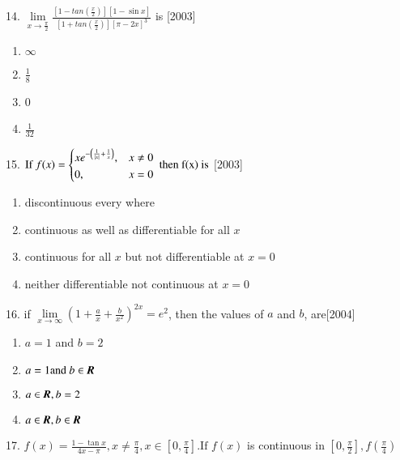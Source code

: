 \documentclass[journal,12pt,twocolumn]{IEEEtran}
\theoremstyle{remark}
\begin{document}
14. $\displaystyle \lim\limits_{x\to\frac{\pi}{2}}\frac{\left[1-tan\left(\frac{x}{2}\right)\right]\left[1-\sin x\right]}{ \left[1+tan\left(\frac{x}{2}\right)\right]\left[\pi-2x\right]^3}$ is \hfill [2003]

\begin{enumerate}
    \item $\infty$
    \item $\frac{1}{8}$
    \item 0
    \item $\frac{1}{32}$\\[2pt]
\end{enumerate}

15. $\displaystyle \text{If } f(x)=
    \begin{dcases}
        xe^{-\left( \frac{1}{|x|} + \frac{1}{x} \right)},&x\neq 0\\ 
        0                                    ,&x = 0
    \end{dcases}
   \text{ then f(x) is}
$ \hfill [2003]

\begin{enumerate}
    \item discontinuous every where
    \item continuous as well as differentiable for all $x$
    \item continuous for all $x$ but not differentiable at $x=0$
    \item neither differentiable not continuous at $x=0$
\end{enumerate}

16. if $\displaystyle \lim\limits_{x\to\infty}\left(1+\frac{a}{x}+\frac{b}{x^2}\right)^{2x}=e^2$, then the values of $a$ and $b$, are\hfill [2004]

\begin{enumerate}
    \item $a=1$ and $b=2$
    \item $a=1 \text{and }b\in \textbf{\textit{R}}$
    \item $a\in \textbf{\textit{R}},b=2$
    \item $a\in \textbf{\textit{R}},b\in \textbf{\textit{R}}$\\[2pt]
\end{enumerate}

17. $\displaystyle f(x)=\frac{1-\tan x}{4x-\pi}, x\neq\frac{\pi}{4},x\in\left[0,\frac{\pi}{4}\right]\text{.If }f(x)$ is continuous in $\displaystyle\left[0,\frac{\pi}{2}\right],$$f\left(\frac{\pi}{4}\right)$
\end{document}
